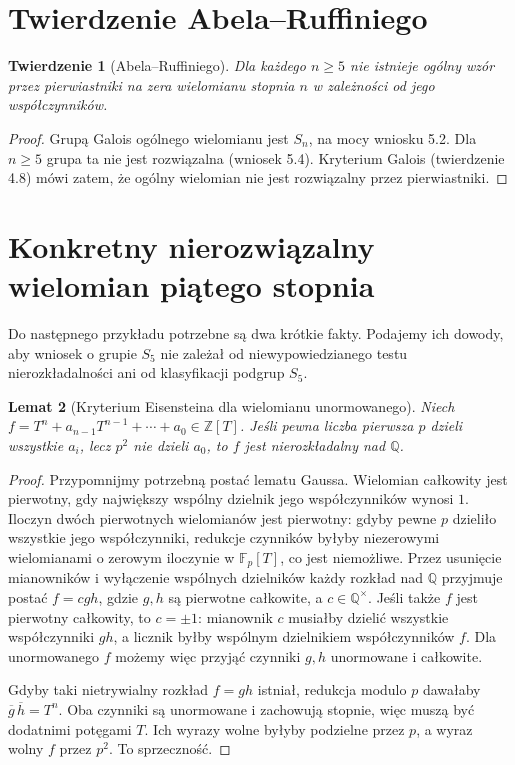 \documentclass[11pt,a4paper,oneside]{book}
\numberwithin{equation}{section}
\theoremstyle{plain}
\newtheorem{twierdzenie}{Twierdzenie}[chapter]
\newtheorem{lemat}[twierdzenie]{Lemat}
\theoremstyle{definition}
\theoremstyle{remark}
\newcommand{\Q}{\mathbb{Q}}
\newcommand{\Z}{\mathbb{Z}}
\newcommand{\F}{\mathbb{F}}
\begin{document}
\section{Twierdzenie Abela--Ruffiniego}

\begin{twierdzenie}[Abela--Ruffiniego]
Dla każdego $n\ge5$ nie istnieje ogólny wzór przez pierwiastniki na zera wielomianu stopnia $n$ w zależności od jego współczynników.
\end{twierdzenie}
\begin{proof}
Grupą Galois ogólnego wielomianu jest $S_n$, na mocy wniosku 5.2. Dla $n\ge5$ grupa ta nie jest rozwiązalna (wniosek 5.4). Kryterium Galois (twierdzenie 4.8) mówi zatem, że ogólny wielomian nie jest rozwiązalny przez pierwiastniki.
\end{proof}

\section{Konkretny nierozwiązalny wielomian piątego stopnia}

Do następnego przykładu potrzebne są dwa krótkie fakty. Podajemy ich dowody, aby wniosek o grupie $S_5$ nie zależał od niewypowiedzianego testu nierozkładalności ani od klasyfikacji podgrup $S_5$.

\begin{lemat}[Kryterium Eisensteina dla wielomianu unormowanego]
Niech $f=T^n+a_{n-1}T^{n-1}+\cdots+a_0\in\Z[T]$. Jeśli pewna liczba pierwsza $p$ dzieli wszystkie $a_i$, lecz $p^2$ nie dzieli $a_0$, to $f$ jest nierozkładalny nad $\Q$.
\end{lemat}
\begin{proof}
Przypomnijmy potrzebną postać lematu Gaussa. Wielomian całkowity jest pierwotny, gdy największy wspólny dzielnik jego współczynników wynosi $1$. Iloczyn dwóch pierwotnych wielomianów jest pierwotny: gdyby pewne $p$ dzieliło wszystkie jego współczynniki, redukcje czynników byłyby niezerowymi wielomianami o zerowym iloczynie w $\F_p[T]$, co jest niemożliwe. Przez usunięcie mianowników i wyłączenie wspólnych dzielników każdy rozkład nad $\Q$ przyjmuje postać $f=cgh$, gdzie $g,h$ są pierwotne całkowite, a $c\in\Q^\times$. Jeśli także $f$ jest pierwotny całkowity, to $c=\pm1$: mianownik $c$ musiałby dzielić wszystkie współczynniki $gh$, a licznik byłby wspólnym dzielnikiem współczynników $f$. Dla unormowanego $f$ możemy więc przyjąć czynniki $g,h$ unormowane i całkowite.

Gdyby taki nietrywialny rozkład $f=gh$ istniał, redukcja modulo $p$ dawałaby $\overline g\,\overline h=T^n$. Oba czynniki są unormowane i zachowują stopnie, więc muszą być dodatnimi potęgami $T$. Ich wyrazy wolne byłyby podzielne przez $p$, a wyraz wolny $f$ przez $p^2$. To sprzeczność.
\end{proof}
\end{document}

